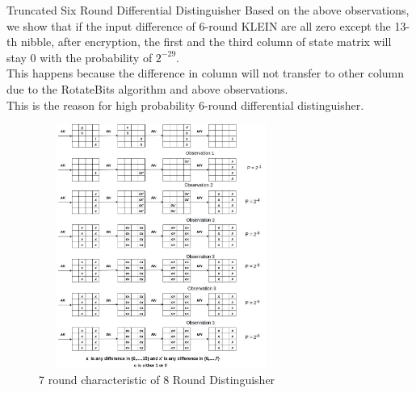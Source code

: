 \begin{frame}{Truncated Six Round Differential Distinguisher}
Based on the above observations, we show that if the input difference of 6-round KLEIN are all zero except the 13-th nibble, after encryption, the first and the third column of state matrix will stay 0 with the probability of $2^{-29}$.\\
This happens because the difference in column will not transfer to other column due to the RotateBits algorithm and above observations. \\ This is the reason for high probability 6-round differential distinguisher.
\end{frame}
\begin{frame}

\begin{figure}[h!]
    \centering
    \includegraphics[width= 8cm, height= 8cm, keepaspectratio]{images/7round characteristic of round reduced.jpg}
    \caption{7 round characteristic of 8 Round Distinguisher}
    \label{fig:6distinguisher}
\end{figure}
\\ \\
\end{frame}

